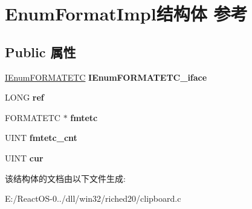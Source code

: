 \hypertarget{struct_enum_format_impl}{}\section{Enum\+Format\+Impl结构体 参考}
\label{struct_enum_format_impl}
\subsection*{Public 属性}
\begin{DoxyCompactItemize}
\item 
\mbox{\label{struct_enum_format_impl_a8e436a4ac06a2927fbe06b62cb72bc90}} 
\hyperlink{interface_i_enum_f_o_r_m_a_t_e_t_c}{I\+Enum\+F\+O\+R\+M\+A\+T\+E\+TC} {\bfseries I\+Enum\+F\+O\+R\+M\+A\+T\+E\+T\+C\+\_\+iface}
\item 
\mbox{\label{struct_enum_format_impl_a78bbd7e208ff09eec4b530a25fe4b917}} 
L\+O\+NG {\bfseries ref}
\item 
\mbox{\label{struct_enum_format_impl_ad58f4fc9da3f5bf31435cc18b5b6fc1d}} 
F\+O\+R\+M\+A\+T\+E\+TC $\ast$ {\bfseries fmtetc}
\item 
\mbox{\label{struct_enum_format_impl_ad05b513da7ce07c4ebfc331ec38dc1e3}} 
U\+I\+NT {\bfseries fmtetc\+\_\+cnt}
\item 
\mbox{\label{struct_enum_format_impl_a15dddc8f0f97847b79e867cc5b28623c}} 
U\+I\+NT {\bfseries cur}
\end{DoxyCompactItemize}


该结构体的文档由以下文件生成\+:\begin{DoxyCompactItemize}
\item 
E\+:/\+React\+O\+S-\/0../dll/win32/riched20/clipboard.\+c\end{DoxyCompactItemize}
